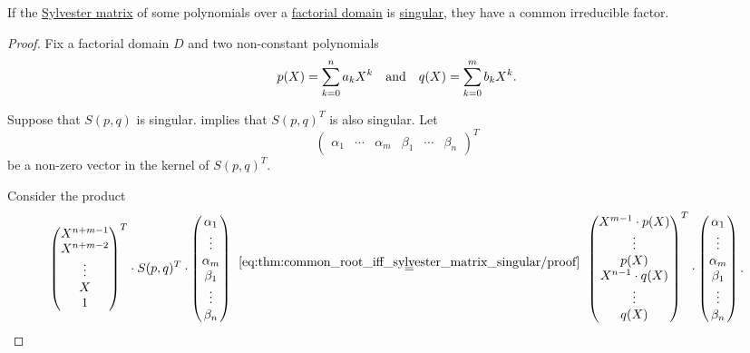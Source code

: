 \begin{proposition}\label{thm:sylvester_matrix_singular_implies_common_factor}
  If the \hyperref[def:sylvester_matrix]{Sylvester matrix} of some polynomials over a \hyperref[def:factorial_domain]{factorial domain} is \hyperref[def:inverse_matrix]{singular}, they have a common irreducible factor.
\end{proposition}
\begin{proof}
  Fix a factorial domain \( D \) and two non-constant polynomials
  \begin{align*}
    p(X) = \sum_{k=0}^n a_k X^k
    &&\T{and}&&
    q(X) = \sum_{k=0}^m b_k X^k.
  \end{align*}

  Suppose that \( S(p, q) \) is singular.  implies that \( S(p, q)^T \) is also singular. Let
  \begin{equation*}
    \begin{pmatrix}
      \alpha_1 &
      \cdots   &
      \alpha_m &
      \beta_1  &
      \cdots   &
      \beta_n
    \end{pmatrix}^T
  \end{equation*}
  be a non-zero vector in the kernel of \( S(p, q)^T \).

  Consider the product
  \begin{equation*}
    \begin{pmatrix}
      X^{n+m-1} \\
      X^{n+m-2} \\
      \vdots    \\
      X         \\
      1
    \end{pmatrix}^T
    \cdot
    S(p, q)^T
    \cdot
    \begin{pmatrix}
      \alpha_1 \\
      \vdots   \\
      \alpha_m \\
      \beta_1  \\
      \vdots   \\
      \beta_n
    \end{pmatrix}
    \reloset {\eqref{eq:thm:common_root_iff_sylvester_matrix_singular/proof}} =
    \begin{pmatrix}
      X^{m-1} \cdot p(X) \\
      \vdots             \\
      p(X)               \\
      X^{n-1} \cdot q(X) \\
      \vdots             \\
      q(X)
    \end{pmatrix}^T
    \cdot
    \begin{pmatrix}
      \alpha_1 \\
      \vdots   \\
      \alpha_m \\
      \beta_1  \\
      \vdots   \\
      \beta_n
    \end{pmatrix}.
  \end{equation*}


\end{proof}
